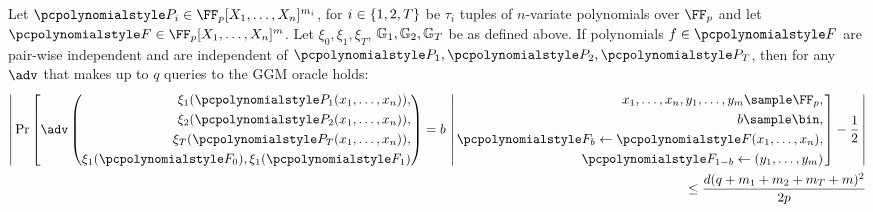 \documentclass[runningheads,10pt]{llncs}
\begin{document}
\begin{theorem}
  \label{thm:uber_assumption}
  Let $\p{P}_i \in \FF_p[X_1, \ldots, X_n]^{m_i}$, for
  $i \in \{1, 2, T\}$ be $\tau_i$ tuples of $n$-variate polynomials over
  $\FF_p$ and let $\p{F} \in \FF_p[X_1, \ldots, X_n]^m$. Let
  $\xi_0, \xi_1, \xi_T$, $\mathbb{G}_1, \mathbb{G}_2, \mathbb{G}_T$ be as defined above. If
  polynomials $f \in \p{F}$ are pair-wise independent and are independent of
  $\p{P}_1, \p{P}_2, \p{P}_T$, then for any $\adv$ that makes up to $q$ queries to the
  GGM oracle holds:
  \begin{equation*}
    \begin{split}
     \left|\,
    \Pr\left[
    \adv\left(
      \begin{aligned}
        \xi_1(\p{P}_1(x_1, \ldots, x_n)), \\
        \xi_2(\p{P}_2(x_1, \ldots, x_n)), \\
        \xi_T(\p{P}_T(x_1, \ldots, x_n)), \\
        \xi_{1}(\p{F}_0), \xi_{1}(\p{F}_1)
      \end{aligned}
    \right) = b
    \, \left|\,
      \begin{aligned}
        x_1, \ldots, x_n, y_1, \ldots, y_m \sample \FF_p,\\
        b \sample \bin, \\
        \p{F}_b \gets \p{F}(x_1, \ldots, x_n),\\
        \p{F}_{1 - b} \gets (y_1, \ldots, y_m)
      \end{aligned}
    \right.  \right] - \frac{1}{2} \, \right| \\
     \leq \frac{d(q + m_1 + m_2 + m_T +
      m)^2 }{2p}
    \end{split}
  \end{equation*}
\end{theorem}
\end{document}
